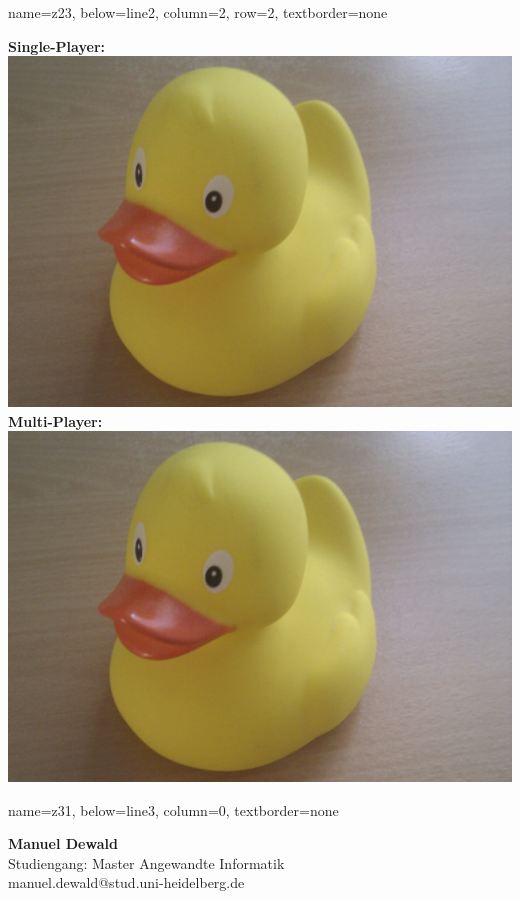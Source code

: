 \documentclass[portrait,a0paper]{baposter}
\begin{document}
\begin{poster}
{ }
    {
    name=z23,
    below=line2,
    column=2,
    row=2,
    textborder=none
    }
    {
 \textbf{Single-Player:}\\
\includegraphics[width=\textwidth]{imgs/tmp_img2.png}
 \textbf{Multi-Player:}\\
\includegraphics[width=\textwidth]{imgs/tmp_img2.png}

 }



 {}

    {
    name=z31,
    below=line3,
    column=0,
    textborder=none
    }
    {
    \textsf{\textbf{Manuel Dewald}\\
    Studiengang: Master Angewandte Informatik\\
	manuel.dewald@stud.uni-heidelberg.de
	}

}
\end{poster}
\end{document}

